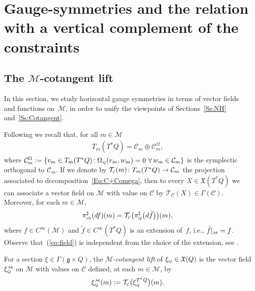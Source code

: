 \documentclass[10pt,a4paper]{amsart}
\numberwithin{equation}{section}
\def\M{\mathcal{M}}
\def\C{\mathcal{C}}
\def\g{\mathfrak{g}}
\def\nh{{\mbox{\tiny{nh}}}}
\def\subC{{\mbox{\tiny{$\C$}}}}
\def\subM{{\mbox{\tiny{$\M$}}}}
\def\subQQ{{\mbox{\tiny{$Q$}}}}
\begin{document}
\section[Gauge-symmetries and the relation with a vertical complement of the constraints]{Gauge-symmetries and the relation\\ with a vertical complement of the constraints}\label{S:GaugeSym}

\subsection[The $\M$-cotangent lift]{The $\boldsymbol{\M}$-cotangent lift}

In this section, we study horizontal gauge symmetries in terms of vector f\/ields
and functions on~$\M$, in order to unify the viewpoints of
Sections~\ref{Ss:NH} and~\ref{Ss:Cotangent}.

Following \cite{BS93,CushmanBook} we recall that, for all $m\in\M$
\begin{gather} \label{Eq:C+Comega}
T_m(T^*Q) = \C_m  \oplus {\C}_m^\Omega,
\end{gather}
where ${\C}^\Omega_m := \{ v_m \in T_m(T^*Q) \colon \Omega_{\mbox{\tiny{$Q$}}}
(v_m , w_m) = 0 \ \forall\, w_m \in {\C}_m\}$ is the symplectic orthogonal to $\C_m$.
If we denote by ${\mathcal T}_\subC(m) \colon T_m(T^*Q) \to \C_m$ the projection associated
to decomposition~\eqref{Eq:C+Comega}, then to every $X\in \mathfrak{X}(T^*Q)$
we can associate a vector f\/ield on $\M$ with value on $\C$ by
$\mathcal{T}_\C(X)\in \Gamma(\C)$. Moreover, for each $m\in \M$,
\begin{gather}\label{eq:field}
\pi_\nh^\sharp(df)(m) =  {\mathcal T}_\subC \big(\pi_\subQQ^\sharp\big(d \tilde f\big)\big)(m),
\end{gather}
where $f\in C^\infty(\M)$ and $\tilde f\in C^\infty(T^*Q)$ is an extension of~$f$,
i.e., $\tilde f|_\subM = f$.
Observe that~(\ref{eq:field}) is independent from the choice of the extension,
see \cite{IbLeMaMa1999, sniatycki}.

\begin{Definition}\label{Def:M-lift}
 For a section $\xi\in \Gamma(\g\times Q)$, the {\it $\M$-cotangent lift} of
 $\xi_\subQQ\in \mathfrak{X}(Q)$ is the vector f\/ield $\xi_\subQQ^\subM$ on $\M$
 with values on $\C$ def\/ined, at each $m\in\M$, by
 \begin{gather*}
 \xi_\subQQ^\subM (m) := {\mathcal T}_\subC \big(\xi_\subQQ^{T^*Q} \big)(m).
 \end{gather*}
\end{Definition}
\end{document}
